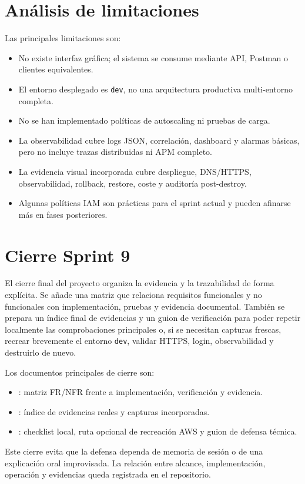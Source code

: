 \section{Análisis de limitaciones}
\label{sec:analisis-limitaciones}

Las principales limitaciones son:

\begin{itemize}
  \item No existe interfaz gráfica; el sistema se consume mediante API, Postman o clientes equivalentes.
  \item El entorno desplegado es \texttt{dev}, no una arquitectura productiva multi-entorno completa.
  \item No se han implementado políticas de autoscaling ni pruebas de carga.
  \item La observabilidad cubre logs JSON, correlación, dashboard y alarmas básicas, pero no incluye trazas distribuidas ni APM completo.
  \item La evidencia visual incorporada cubre despliegue, DNS/HTTPS, observabilidad, rollback, restore, coste y auditoría post-destroy.
  \item Algunas políticas IAM son prácticas para el sprint actual y pueden afinarse más en fases posteriores.
\end{itemize}

\section{Cierre Sprint 9}
\label{sec:cierre-sprint9}

El cierre final del proyecto organiza la evidencia y la trazabilidad de forma explícita. Se añade una matriz que relaciona requisitos funcionales y no funcionales con implementación, pruebas y evidencia documental. También se prepara un índice final de evidencias y un guion de verificación para poder repetir localmente las comprobaciones principales o, si se necesitan capturas frescas, recrear brevemente el entorno \texttt{dev}, validar HTTPS, login, observabilidad y destruirlo de nuevo.

Los documentos principales de cierre son:

\begin{itemize}
  \item {}: matriz FR/NFR frente a implementación, verificación y evidencia.
  \item {}: índice de evidencias reales y capturas incorporadas.
  \item {}: checklist local, ruta opcional de recreación AWS y guion de defensa técnica.
\end{itemize}

Este cierre evita que la defensa dependa de memoria de sesión o de una explicación oral improvisada. La relación entre alcance, implementación, operación y evidencias queda registrada en el repositorio.
